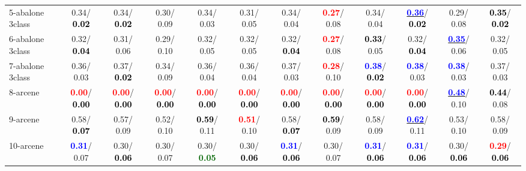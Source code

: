 \begin{table}[h]
\begin{center}
{\begin{tabular}{lc|c|c|c|c|c|c|c|c|c|c}
5-abalone 3class &   0.34/\textcolor{black}{\textbf{  0.02}} &   0.34/\textcolor{black}{\textbf{  0.02}} &   0.30/  0.09 &   0.34/  0.03 &   0.31/  0.05 &   0.34/  0.04 & \textcolor{red}{\textbf{  0.27}}/  0.08 &   0.34/  0.04 & \underline{\textcolor{blue}{\textbf{  0.36}}}/\textcolor{black}{\textbf{  0.02}} &   0.29/  0.08 & \textcolor{black}{\textbf{  0.35}}/\textcolor{black}{\textbf{  0.02}} \\
6-abalone 3class &   0.32/\textcolor{black}{\textbf{  0.04}} &   0.31/  0.06 &   0.29/  0.10 &   0.32/  0.05 &   0.32/  0.05 &   0.32/\textcolor{black}{\textbf{  0.04}} & \textcolor{red}{\textbf{  0.27}}/  0.08 & \textcolor{black}{\textbf{  0.33}}/  0.05 &   0.32/\textcolor{black}{\textbf{  0.04}} & \underline{\textcolor{blue}{\textbf{  0.35}}}/  0.06 &   0.32/  0.05 \\
7-abalone 3class &   0.36/  0.03 &   0.37/\textcolor{black}{\textbf{  0.02}} &   0.34/  0.09 &   0.36/  0.04 &   0.36/  0.04 &   0.37/  0.03 & \textcolor{red}{\textbf{  0.28}}/  0.10 & \textcolor{blue}{\textbf{  0.38}}/\textcolor{black}{\textbf{  0.02}} & \textcolor{blue}{\textbf{  0.38}}/  0.03 & \textcolor{blue}{\textbf{  0.38}}/  0.03 &   0.37/  0.03 \\ \hline
8-arcene & \textcolor{red}{\textbf{  0.00}}/\textcolor{black}{\textbf{  0.00}} & \textcolor{red}{\textbf{  0.00}}/\textcolor{black}{\textbf{  0.00}} & \textcolor{red}{\textbf{  0.00}}/\textcolor{black}{\textbf{  0.00}} & \textcolor{red}{\textbf{  0.00}}/\textcolor{black}{\textbf{  0.00}} & \textcolor{red}{\textbf{  0.00}}/\textcolor{black}{\textbf{  0.00}} & \textcolor{red}{\textbf{  0.00}}/\textcolor{black}{\textbf{  0.00}} & \textcolor{red}{\textbf{  0.00}}/\textcolor{black}{\textbf{  0.00}} & \textcolor{red}{\textbf{  0.00}}/\textcolor{black}{\textbf{  0.00}} & \textcolor{red}{\textbf{  0.00}}/\textcolor{black}{\textbf{  0.00}} & \underline{\textcolor{blue}{\textbf{  0.48}}}/  0.10 & \textcolor{black}{\textbf{  0.44}}/  0.08 \\
9-arcene &   0.58/\textcolor{black}{\textbf{  0.07}} &   0.57/  0.09 &   0.52/  0.10 & \textcolor{black}{\textbf{  0.59}}/  0.11 & \textcolor{red}{\textbf{  0.51}}/  0.10 &   0.58/\textcolor{black}{\textbf{  0.07}} & \textcolor{black}{\textbf{  0.59}}/  0.09 &   0.58/  0.09 & \underline{\textcolor{blue}{\textbf{  0.62}}}/  0.11 &   0.53/  0.10 &   0.58/  0.09 \\
10-arcene & \textcolor{blue}{\textbf{  0.31}}/  0.07 &   0.30/\textcolor{black}{\textbf{  0.06}} &   0.30/  0.07 &   0.30/\textcolor{darkgreen}{\textbf{  0.05}} &   0.30/\textcolor{black}{\textbf{  0.06}} & \textcolor{blue}{\textbf{  0.31}}/\textcolor{black}{\textbf{  0.06}} &   0.30/  0.07 & \textcolor{blue}{\textbf{  0.31}}/\textcolor{black}{\textbf{  0.06}} & \textcolor{blue}{\textbf{  0.31}}/\textcolor{black}{\textbf{  0.06}} &   0.30/\textcolor{black}{\textbf{  0.06}} & \textcolor{red}{\textbf{  0.29}}/\textcolor{black}{\textbf{  0.06}} \\

\end{tabular}}
\end{center}
\end{table}
